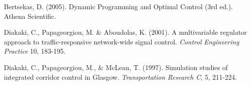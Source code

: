 \documentclass[11pt]{article}
\begin{document}
\begin{thebibliography}{9}
Bertsekas, D. (2005). Dynamic Programming and Optimal Control (3rd ed.). Athena Scientific.

Diakaki, C., Papageorgiou, M. \& Aboudolas, K. (2001).
A multivariable regulator approach to traffic-responsive network-wide signal control.
\textit{Control Engineering Practice} 10, 183-195.

Diakaki, C., Papageorgiou, M., \& McLean, T. (1997). Simulation studies of integrated corridor control in Glasgow. 
\textit{Transportation Research C}, 5, 211-224.

\end{thebibliography}

\end{document}

